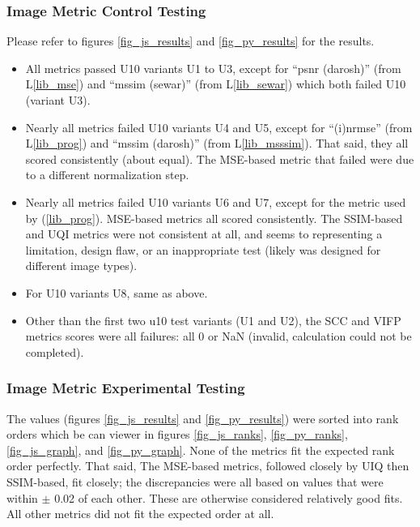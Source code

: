 \documentclass[12pt, titlepage]{article}
\newcommand{\lref}[1]{L\ref{#1}}
\begin{document}
\subsubsection{Image Metric Control Testing}
Please refer to figures \ref{fig_js_results} and \ref{fig_py_results} for the results.
\begin{itemize}
  \item All metrics passed U10 variants U1 to U3,
    except for ``psnr (darosh)'' (from \lref{lib_mse}) and ``mssim (sewar)'' (from \lref{lib_sewar})
    which both failed U10 (variant U3).
  \item Nearly all metrics failed U10 variants U4 and U5,
    except for ``(i)nrmse'' (from \lref{lib_prog}) and ``mssim (darosh)'' (from \lref{lib_msssim}).
    That said, they all scored consistently (about equal).
    The MSE-based metric that failed were due to a different
    normalization step.
  \item Nearly all metrics failed U10 variants U6 and U7,
    except for the metric used by \progname{} (\ref{lib_prog}).
    MSE-based metrics all scored consistently. The SSIM-based and UQI
    metrics were not consistent at all, and seems to representing
    a limitation, design flaw, or an inappropriate test
    (likely was designed for different image types).
  \item For U10 variants U8, same as above.
  \item Other than the first two u10 test variants (U1 and U2),
    the SCC and VIFP metrics scores were all failures:
    all 0 or NaN (invalid, calculation could not be completed).
\end{itemize}


\subsubsection{Image Metric Experimental Testing}
The values (figures \ref{fig_js_results} and \ref{fig_py_results}) were sorted into
rank orders which be can viewer in figures \ref{fig_js_ranks}, \ref{fig_py_ranks},
\ref{fig_js_graph}, and \ref{fig_py_graph}.
None of the metrics fit the expected rank order perfectly. That said,
The MSE-based metrics, followed closely by UIQ then SSIM-based, fit closely; the discrepancies
were all based on values that were within $\pm$ 0.02 of each other. These are otherwise considered
relatively good fits. All other metrics did not fit the expected order at all.
\end{document}

